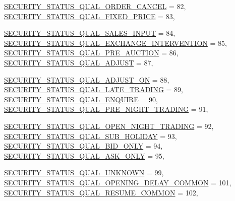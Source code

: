 \begin{CompactItemize}
\hyperlink{namespaceWombat_2de6f22c731ba94169dc24b8054862b808e1e0557d126753b9cd05ca83c2fcee}{SECURITY\_\-STATUS\_\-QUAL\_\-ORDER\_\-CANCEL} =  82, 
\hyperlink{namespaceWombat_2de6f22c731ba94169dc24b8054862b8afb16cd7b74f80ec78e737af2dedad6e}{SECURITY\_\-STATUS\_\-QUAL\_\-FIXED\_\-PRICE} =  83, 
\par
\hyperlink{namespaceWombat_2de6f22c731ba94169dc24b8054862b84f6c38e16988063b307c75741e61822c}{SECURITY\_\-STATUS\_\-QUAL\_\-SALES\_\-INPUT} =  84, 
\hyperlink{namespaceWombat_2de6f22c731ba94169dc24b8054862b821ac863f5eabe02b972316d5914f53fb}{SECURITY\_\-STATUS\_\-QUAL\_\-EXCHANGE\_\-INTERVENTION} =  85, 
\hyperlink{namespaceWombat_2de6f22c731ba94169dc24b8054862b8e21f344bb77230edffbcbc5a8c6e6aa1}{SECURITY\_\-STATUS\_\-QUAL\_\-PRE\_\-AUCTION} =  86, 
\hyperlink{namespaceWombat_2de6f22c731ba94169dc24b8054862b8e97e7f5fef05603f3227d7b4ce3810ba}{SECURITY\_\-STATUS\_\-QUAL\_\-ADJUST} =  87, 
\par
\hyperlink{namespaceWombat_2de6f22c731ba94169dc24b8054862b865e2f8a71bf9008bd5f547225bfb1cf6}{SECURITY\_\-STATUS\_\-QUAL\_\-ADJUST\_\-ON} =  88, 
\hyperlink{namespaceWombat_2de6f22c731ba94169dc24b8054862b8f0a423973a7fb3e6c0b24b8c71642e37}{SECURITY\_\-STATUS\_\-QUAL\_\-LATE\_\-TRADING} =  89, 
\hyperlink{namespaceWombat_2de6f22c731ba94169dc24b8054862b8bd683dfcc615a2c2c6e2c666c47201ba}{SECURITY\_\-STATUS\_\-QUAL\_\-ENQUIRE} =  90, 
\hyperlink{namespaceWombat_2de6f22c731ba94169dc24b8054862b822a56c5d1633a74c9e4738d9282dc59c}{SECURITY\_\-STATUS\_\-QUAL\_\-PRE\_\-NIGHT\_\-TRADING} =  91, 
\par
\hyperlink{namespaceWombat_2de6f22c731ba94169dc24b8054862b8b7b413a04f1bb8fa58b546aa8d8beaad}{SECURITY\_\-STATUS\_\-QUAL\_\-OPEN\_\-NIGHT\_\-TRADING} =  92, 
\hyperlink{namespaceWombat_2de6f22c731ba94169dc24b8054862b89a556e126da8da7e83ee3ec630481f07}{SECURITY\_\-STATUS\_\-QUAL\_\-SUB\_\-HOLIDAY} =  93, 
\hyperlink{namespaceWombat_2de6f22c731ba94169dc24b8054862b8eb82219325c2adf135da420d7dc33c38}{SECURITY\_\-STATUS\_\-QUAL\_\-BID\_\-ONLY} =  94, 
\hyperlink{namespaceWombat_2de6f22c731ba94169dc24b8054862b8a717da58060207e7d54b50b7da7d8f18}{SECURITY\_\-STATUS\_\-QUAL\_\-ASK\_\-ONLY} =  95, 
\par
\hyperlink{namespaceWombat_2de6f22c731ba94169dc24b8054862b88dd0945520c9755d946c3a23cd047448}{SECURITY\_\-STATUS\_\-QUAL\_\-UNKNOWN} =  99, 
\hyperlink{namespaceWombat_2de6f22c731ba94169dc24b8054862b8f2a6e7dbd61d16d80d154182ecc35c88}{SECURITY\_\-STATUS\_\-QUAL\_\-OPENING\_\-DELAY\_\-COMMON} =  101, 
\hyperlink{namespaceWombat_2de6f22c731ba94169dc24b8054862b848bb58330d037b91639f9e2979b842ab}{SECURITY\_\-STATUS\_\-QUAL\_\-RESUME\_\-COMMON} =  102, 

\end{CompactItemize}
